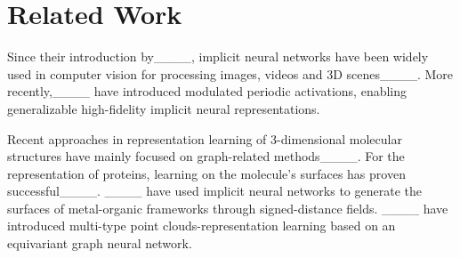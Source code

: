 \section{Related Work}
Since their introduction by____, implicit neural networks have been widely used in computer vision for processing images, videos and 3D scenes____. More recently,____ have introduced modulated periodic activations, enabling generalizable high-fidelity implicit neural representations. 

Recent approaches in representation learning of 3-dimensional molecular structures have mainly focused on graph-related methods____. For the representation of proteins, learning on the molecule's surfaces has proven successful____. ____ have used implicit neural networks to generate the surfaces of metal-organic frameworks through signed-distance fields. ____ have introduced multi-type point clouds-representation learning based on an equivariant graph neural network.